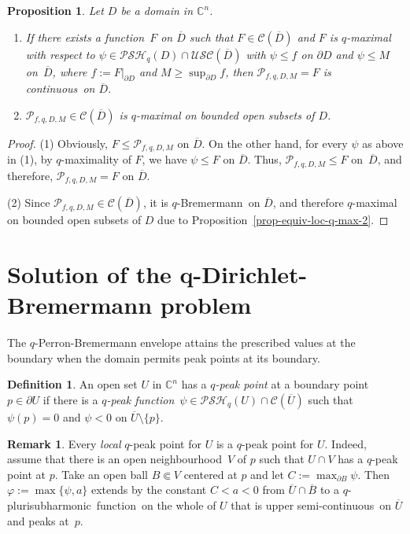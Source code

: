 \documentclass[reqno]{amsart}
\newtheorem{prop}[thm]{Proposition}
\theoremstyle{definition}
\newtheorem{defn}[thm]{Definition}
\newtheorem{rem}[thm]{Remark}
\numberwithin{equation}{section}
\newcommand{\cbb}{\mathbb{C}}
\newcommand{\ccal}{\mathcal{C}}
\newcommand{\pcal}{\mathcal{P}}
\newcommand{\USC}{\mathcal{USC}}
\newcommand{\qbrem}{$q$-Bremermann}
\newcommand{\qpsh}{$q$-pluri\-sub\-harmonic}
\newcommand{\PSH}{\mathcal{PSH}}
\newcommand{\cl}[1]{\overline{#1}}
\newcommand{\nbh}{neighbourhood}
\newcommand{\cont}{continuous}
\newcommand{\usc}{upper semi-continuous}
\newcommand{\fct}{function}
\newcommand{\cld}{\overline{D}}
\newcommand{\relc}{\Subset}
\begin{document}
\begin{prop}\label{prop-q-Perron-q-max} Let $D$ be a domain in $\cbb^n$.

\begin{enumerate}

\item If there exists a \fct\ $F$ on $\cld$ such that $F \in \ccal(\cld)$ and $F$ is $q$-maximal with respect to $\psi \in \PSH_q(D)\cap\USC(\cld)$ with $\psi \leq f$ on $\partial D$ and $\psi \leq M$ on~$\cld$, where $f:=F|_{\partial D}$ and $M\geq\sup_{\partial D} f$, then $\pcal_{f,q,D,M} = F$ is \cont\ on $\cld$.

\item $\pcal_{f,q,D,M} \in \ccal(\cld)$ is $q$-maximal on bounded open subsets of $D$. 
\end{enumerate}

\end{prop}

\begin{proof} (1) Obviously, $F\leq \pcal_{f,q,D,M}$ on $\cld$. On the other hand, for every $\psi$ as above in (1), by $q$-maximality of $F$, we have $\psi \leq F$ on $\cld$. Thus, $\pcal_{f,q,D,M} \leq F$ on~$\cld$, and therefore, $\pcal_{f,q,D,M} = F$ on $\cld$.

(2) Since $\pcal_{f,q,D,M} \in \ccal(\cld)$, it is \qbrem\ on $\cld$, and therefore $q$-maximal on bounded open subsets of $D$ due to Proposition~\ref{prop-equiv-loc-q-max-2}.
\end{proof}







\section{Solution of the q-Dirichlet-Bremermann problem}

The $q$-Perron-Bremermann envelope attains the prescribed values at the boundary when the domain permits peak points at its boundary.

\begin{defn}\label{defn-q-peak} An open set $U$ in $\cbb^n$ has a \textit{$q$-peak point} at a boundary point $p \in \partial U$ if there is a \textit{$q$-peak \fct}\ $\psi \in \PSH_q(U) \cap \ccal(\cl{U})$ such that $\psi(p)=0$ and $\psi<0$ on $\cl{U}\setminus\{p\}$.
\end{defn}

\begin{rem} Every \textit{local} $q$-peak point for $U$ is a $q$-peak point for $U$. Indeed, assume that there is an open \nbh\ $V$ of $p$ such that $U \cap V$ has a $q$-peak point at $p$. Take an open ball $B \relc V$ centered at $p$ and let $C:=\max_{\partial B} \psi$. Then $\varphi:=\max\{\psi,a\}$ extends by the constant $C<a<0$ from $\cl{U} \cap \cl{B}$ to a \qpsh\ \fct\ on the whole of $U$ that is \usc\ on $\cl{U}$ and peaks at~$p$.
\end{rem}
\end{document}

